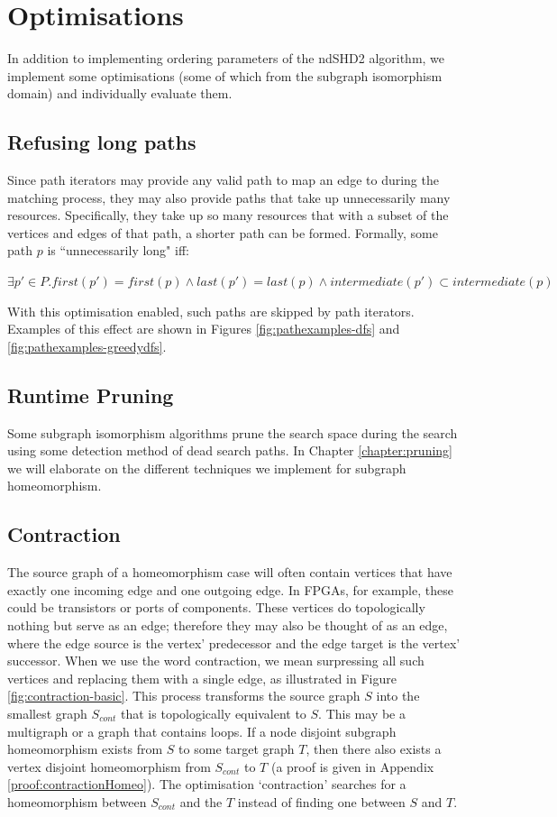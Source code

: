 \section{Optimisations}
In addition to implementing ordering parameters of the ndSHD2 algorithm, we implement some optimisations (some of which from the subgraph isomorphism domain) and individually evaluate them.

\subsection{Refusing long paths}
Since path iterators may provide any valid path to map an edge to during the matching process, they may also provide paths that take up unnecessarily many resources. Specifically, they take up so many resources that with a subset of the vertices and edges of that path, a shorter path can be formed. Formally, some path $p$ is ``unnecessarily long" iff:


$\exists p' \in P . first(p') = first(p) \land last(p') = last(p) \land intermediate(p') \subset intermediate(p)$

With this optimisation enabled, such paths are skipped by path iterators. Examples of this effect are shown in Figures \ref{fig:pathexamples-dfs} and \ref{fig:pathexamples-greedydfs}.

\subsection{Runtime Pruning}
Some subgraph isomorphism algorithms\cite{Cordella2004, McCreesh2015} prune the search space during the search using some detection method of dead search paths. In Chapter \ref{chapter:pruning} we will elaborate on the different techniques we implement for subgraph homeomorphism.

\subsection{Contraction}
The source graph of a homeomorphism case will often contain vertices that have exactly one incoming edge and one outgoing edge. In FPGAs, for example, these could be transistors or ports of components. These vertices do topologically nothing but serve as an edge; therefore they may also be thought of as an edge, where the edge source is the vertex' predecessor and the edge target is the vertex' successor. When we use the word contraction, we mean surpressing all such vertices and replacing them with a single edge, as illustrated in Figure \ref{fig:contraction-basic}. This process transforms the source graph $S$ into the smallest graph $S_{cont}$ that is topologically equivalent to $S$. This may be a multigraph or a graph that contains loops. If a node disjoint subgraph homeomorphism exists from $S$ to some target graph $T$, then there also exists a vertex disjoint homeomorphism from $S_{cont}$ to $T$ (a proof is given in Appendix \ref{proof:contractionHomeo}). The optimisation `contraction' searches for a homeomorphism between $S_{cont}$ and the $T$ instead of finding one between $S$ and $T$.

